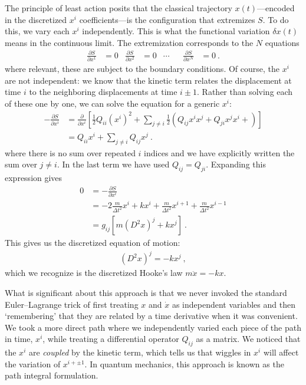 The principle of least action posits that the classical trajectory $x(t)$---encoded in the discretized $x^i$ coefficients---is the configuration that extremizes $S$. To do this, we vary each $x^i$ independently. This is what the functional variation $\delta x(t)$ means in the continuous limit. The extremization corresponds to the $N$ equations
\begin{align}
    \frac{\partial{S}}{\partial{x^1}} &= 0
    &
    \frac{\partial{S}}{\partial{x^2}} &= 0
    &
    \cdots&
    &
    \frac{\partial{S}}{\partial{x^N}} &= 0 \ .
\end{align}
where relevant, these are subject to the boundary conditions. 
% 
Of course, the $x^i$ are not independent: we know that the kinetic term relates the displacement at time $i$ to the neighboring displacements at time $i\pm 1$.
% 
Rather than solving each of these one by one, we can solve the equation for a generic $x^i$:
\begin{align}
    -\frac{ \partial{S} }{ \partial{x^i} } &= 
    \frac{ \partial }{ \partial{x^i} }
    \left[
    \frac{1}{2} Q_{ii}(x^i)^2 + \sum_{j\neq i} \frac{1}{2}\left(Q_{ij} x^ix^j + Q_{ji}x^jx^i + \right) 
    \right] \\
    &= 
    Q_{ii}x^i+ \sum_{j\neq i} Q_{ij}x^j \ .
\end{align}
where there is no sum over repeated $i$ indices and we have explicitly written the sum over $j\neq i$. In the last term we have used $Q_{ij} = Q_{ji}$. Expanding this expression gives
\begin{align}
    0&=
    -\frac{\partial{S}}{\partial{x^i}}
    \\
    &=
    -2\frac{m}{\Delta t^2} x^i + k x^i 
    + \frac{m}{\Delta t^2}x^{i+1} 
    + \frac{m}{\Delta t^2}x^{i-1}
    \\
    &= 
    g_{ij}\left[m(D^2x)^j + k x^j\right] \ .
\end{align}
This gives us the discretized equation of motion:
\begin{align}
    (D^2x)^j = - k x^j \ ,
\end{align}
which we recognize is the discretized Hooke's law $m\ddot{x} = -k x$. 

What is significant about this approach is that we never invoked the standard Euler--Lagrange trick of first treating $x$ and $\dot{x}$ as independent variables and then `remembering' that they are related by a time derivative when it was convenient. We took a more direct path where we independently varied each piece of the path in time, $x^i$, while treating a differential operator $Q_{ij}$ as a matrix. We noticed that the $x^i$ are \emph{coupled} by the kinetic term, which tells us that wiggles in $x^i$ will affect the variation of $x^{i+\pm 1}$. In quantum mechanics, this approach is known as the path integral formulation.

